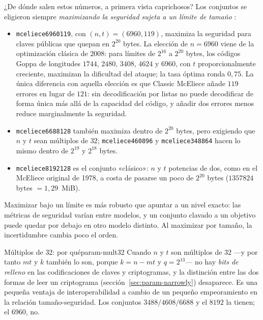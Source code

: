 ¿De dónde salen estos números, a primera vista caprichosos? Los
conjuntos se eligieron siempre \emph{maximizando la seguridad sujeta a
un límite de tamaño} \cite{cmrationale}:

\begin{itemize}[leftmargin=1.5em,itemsep=3pt]
  \item \texttt{mceliece6960119}, con $(n,t)=(6960,119)$, maximiza la
        seguridad para claves públicas que quepan en $2^{20}$ bytes.
        La elección de $n=6960$ viene de la optimización clásica de
        2008: para límites de $2^{16}$ a $2^{20}$ bytes, los códigos
        Goppa de longitudes $1744$, $2480$, $3408$, $4624$ y $6960$,
        con $t$ proporcionalmente creciente, maximizan la dificultad
        del ataque; la tasa óptima ronda $0{,}75$. La única diferencia
        con aquella elección es que Classic McEliece añade $119$
        errores en lugar de $121$: sin decodificación por listas no
        puede decodificar de forma única más allá de la capacidad del
        código, y añadir dos errores menos reduce marginalmente la
        seguridad.
  \item \texttt{mceliece6688128} también maximiza dentro de $2^{20}$
        bytes, pero exigiendo que $n$ y $t$ sean múltiplos de $32$;
        \texttt{mceliece460896} y \texttt{mceliece348864} hacen lo
        mismo dentro de $2^{19}$ y $2^{18}$ bytes.
  \item \texttt{mceliece8192128} es el conjunto «clásico»: $n$ y $t$
        potencias de dos, como en el McEliece original de 1978, a
        costa de pasarse un poco de $2^{20}$ bytes
        ($\num{1357824}$ bytes $=1{,}29$~MiB).
\end{itemize}

Maximizar bajo un límite es más robusto que apuntar a un nivel exacto:
las métricas de seguridad varían entre modelos, y un conjunto clavado
a un objetivo puede quedar por debajo en otro modelo distinto. Al
maximizar por tamaño, la incertidumbre cambia poco el orden.

\begin{observacion}{Múltiplos de $32$: por qué}{param-mult32}
Cuando $n$ y $t$ son múltiplos de $32$ ---y por tanto $mt$ y $k$
también lo son, porque $k=n-mt$ y $q=2^{13}$--- no hay \emph{bits de
relleno} en las codificaciones de claves y criptogramas, y la
distinción entre las dos formas de leer un criptograma
(sección~\ref{sec:param-narrowly}) desaparece. Es una pequeña ventaja
de interoperabilidad a cambio de un pequeño empeoramiento en la
relación tamaño-seguridad. Los conjuntos $3488/4608/6688$ y el
$8192$ la tienen; el $6960$, no.
\end{observacion}

